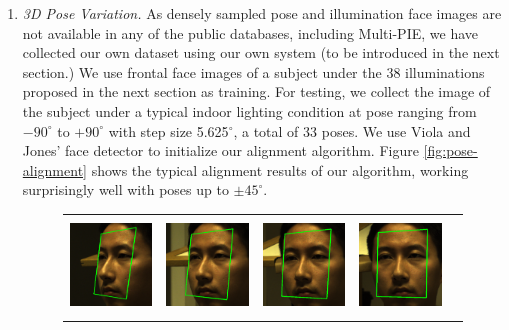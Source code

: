 \begin{enumerate}
\vspace{0mm}
\item{\em 3D Pose Variation.} As densely sampled pose and illumination face images are not available in any of the public databases, including Multi-PIE, we have collected our own dataset using our own system (to be introduced in the next section.) We use frontal face images of a subject under the 38 illuminations proposed in the next section as training. For testing, we collect the image of the subject under a typical indoor lighting condition at pose ranging from $-90^\circ$ to $+90^\circ$ with step size 5.625$^\circ$, a total of 33 poses. We use Viola and Jones' face detector to initialize our alignment algorithm. 
Figure \ref{fig:pose-alignment} shows the typical alignment results of our algorithm, working surprisingly well with poses up to $\pm 45^\circ$. \vspace{0mm}
\begin{figure}
\centering
\begin{tabular}{ccccc}
\includegraphics[height=1in]{figures_cvpr/5} &
\includegraphics[height=1in]{figures_cvpr/7} &
\includegraphics[height=1in]{figures_cvpr/09} &
\includegraphics[height=1in]{figures_cvpr/11} &

\end{tabular}
\end{figure}
\end{enumerate}
